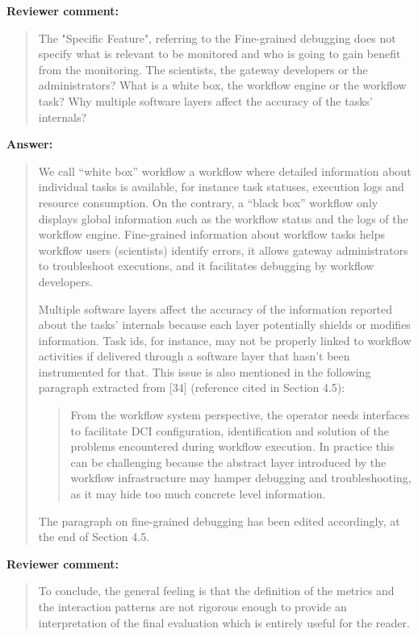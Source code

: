 \documentclass[a4]{article}
\newenvironment{review}%
{\textbf{Reviewer comment:}\begin{quote}}%
{\end{quote}}%
\newenvironment{answer}%
{\textbf{Answer:}\begin{small}\begin{quote}}%
{\end{quote}\end{small}}%
\begin{document}
\begin{review}
  The "Specific Feature", referring to the Fine-grained debugging does
  not specify what is relevant to be monitored and who is going to
  gain benefit from the monitoring. The scientists, the gateway
  developers or the administrators? What is a white box, the workflow
  engine or the workflow task? Why multiple software layers affect the
  accuracy of the tasks' internals?
\end{review}

\begin{answer}
  We call ``white box'' workflow a workflow
  where detailed information about individual tasks is available,
  for instance task statuses, execution logs and resource
  consumption. On the contrary, a ``black box'' workflow only
  displays global information such as the workflow status and the
  logs of the workflow engine. Fine-grained information about
  workflow tasks helps workflow users (scientists)
  identify errors, it allows gateway administrators to troubleshoot
  executions, and it facilitates debugging by workflow
  developers.
  
  Multiple software layers affect the accuracy of the information
  reported about the tasks' internals because each layer potentially
  shields or modifies information. Task ids, for instance, may not be
  properly linked to workflow activities if delivered through a
  software layer that hasn't been instrumented for that. This issue is
  also mentioned in the following paragraph extracted from [34]
  (reference cited in Section 4.5):
\begin{quote}
  From the workflow system perspective, the operator needs interfaces
  to facilitate DCI configuration, identification and solution of the
  problems encountered during workflow execution. In practice this can
  be challenging because the abstract layer introduced by the workflow
  infrastructure may hamper debugging and troubleshooting, as it may
  hide too much concrete level information.
\end{quote}
  
  The paragraph on fine-grained debugging has been edited accordingly, at the end of Section 4.5.
\end{answer}

\begin{review}
  To conclude, the general feeling is that the definition of the
  metrics and the interaction patterns are not rigorous enough to
  provide an interpretation of the final evaluation which is entirely
  useful for the reader.
\end{review}
\end{document}
